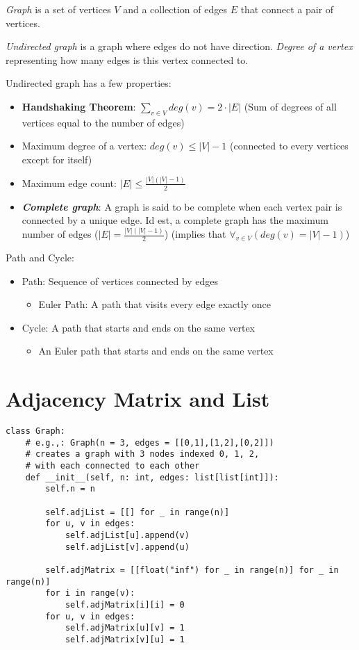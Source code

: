 
\textit{Graph} is a set of vertices $V$ and a collection of edges $E$ that connect a pair of vertices.

\noindent \textit{Undirected graph} is a graph where edges do not have direction. \textit{Degree of a vertex} representing how many edges is this vertex connected to.

Undirected graph has a few properties:
\begin{itemize}
  \item \textbf{Handshaking Theorem}: \(\sum_{v \in V} deg(v) = 2 \cdot |E|\) (Sum of degrees of all vertices equal to the number of edges)
  \item Maximum degree of a vertex: $deg(v) \leq |V| - 1$ (connected to every vertices except for itself)
  \item Maximum edge count: $|E| \leq \frac{|V|(|V| - 1)}{2}$
  \item \textbf{\textit{Complete graph}}: A graph is said to be complete when each vertex pair is connected by a unique edge. Id est, a complete graph has the maximum number of edges ($|E| = \frac{|V|(|V| - 1)}{2}$) (implies that $\forall_{v \in V} (deg(v) = |V| - 1)$)
\end{itemize}

Path and Cycle:
\begin{itemize}
  \item Path: Sequence of vertices connected by edges
  \begin{itemize}
    \item Euler Path: A path that visits every edge exactly once
  \end{itemize}
\item Cycle: A path that starts and ends on the same vertex
  \begin{itemize}
    \item An Euler path that starts and ends on the same vertex
  \end{itemize}
\end{itemize}

\section{Adjacency Matrix and List}

\begin{verbatim}
class Graph:
    # e.g.,: Graph(n = 3, edges = [[0,1],[1,2],[0,2]])
    # creates a graph with 3 nodes indexed 0, 1, 2,
    # with each connected to each other
    def __init__(self, n: int, edges: list[list[int]]):
        self.n = n

        self.adjList = [[] for _ in range(n)]
        for u, v in edges:
            self.adjList[u].append(v)
            self.adjList[v].append(u)

        self.adjMatrix = [[float("inf") for _ in range(n)] for _ in range(n)]
        for i in range(v):
            self.adjMatrix[i][i] = 0
        for u, v in edges:
            self.adjMatrix[u][v] = 1
            self.adjMatrix[v][u] = 1
\end{verbatim}

